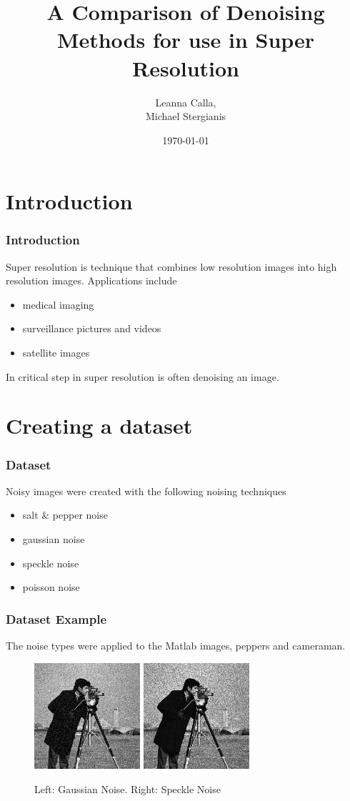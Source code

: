\documentclass{beamer}
\title{A Comparison of Denoising Methods for use in Super Resolution}
\author{Leanna Calla,\\Michael Stergianis}
\institute{University of Ontario Institute of Technology}
\date{\today}
\begin{document}
\frame{\titlepage}
\section{Introduction}
\begin{frame}
  \frametitle{Introduction}
  Super resolution is technique that combines low resolution images
  into high resolution images. Applications include
  \begin{itemize}
  \item medical imaging
  \item surveillance pictures and videos
  \item satellite images
  \end{itemize}
  In critical step in super resolution is
  often denoising an image.
\end{frame}
%
\section{Creating a dataset}
%
\begin{frame}
  \frametitle{Dataset}
  Noisy images were created with the following noising techniques
  \begin{itemize}
  \item salt \& pepper noise
  \item gaussian noise
  \item speckle noise
  \item poisson noise
  \end{itemize}
\end{frame}
%
\begin{frame}
  \frametitle{Dataset Example}
  The noise types were applied to the Matlab images, peppers and
  cameraman.
  \begin{figure}
    \centering
    \includegraphics[width =
    0.35\textwidth]{../images/camera_noisy2.png}
    \includegraphics[width =
    0.35\textwidth]{../images/camera_noisy3.png}
    \caption{Left: Gaussian Noise. Right: Speckle Noise}
  \end{figure}
\end{frame}
\end{document}
